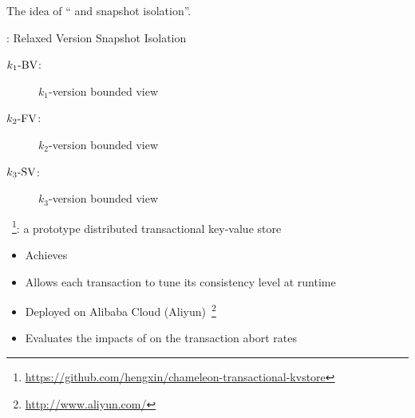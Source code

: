 \begin{frame}{}
  The idea of {\large `` and  snapshot isolation''}.

  \pause
  \vspace{0.50cm}
  \red{\rvsi{}}: Relaxed Version Snapshot Isolation
  \begin{description}
    \item[$k_1\text{-BV}$:] $k_1$-version bounded \emph{} view
    \item[$k_2\text{-FV}$:] $k_2$-version bounded \emph{} view
    \item[$k_3\text{-SV}$:] $k_3$-version bounded \emph{} view
  \end{description}

  \pause
  \vspace{10pt}
  \blue{\chameleon{}}~\footnote{\url{https://github.com/hengxin/chameleon-transactional-kvstore}}: 
  a prototype distributed transactional key-value store
  \begin{itemize}
    \item Achieves \rvsi{}
    \item Allows each transaction to tune its consistency level at runtime
      \pause
    \item Deployed on Alibaba Cloud (Aliyun)~\footnote{\url{http://www.aliyun.com/}}
    \item Evaluates the impacts of \rvsi{} on the transaction abort rates
  \end{itemize}
\end{frame}
